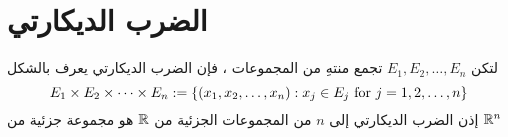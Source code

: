 \section{الضرب الديكارتي}
\begin{definition}
    لتكن $E_1,E_2,\dots,E_n$ تجمع منتهِ من المجموعات ، فإن الضرب الديكارتي يعرف بالشكل
    \[
    E_1\times E_2\times\dots\times E_n:=\left\{(x_1,x_2,\dots,x_n):x_j\in E_j\text{ for } j=1,2,\dots,n\right\}
    \]
    إذن الضرب الديكارتي إلى $n$ من المجموعات الجزئية من $\mathbb{R}$ هو مجموعة جزئية من $\mathbb{R}^n$
\end{definition}
